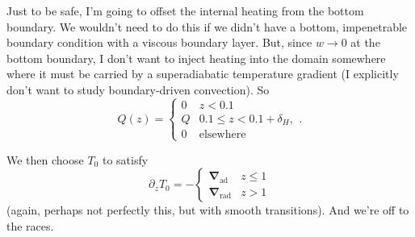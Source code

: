 \documentclass[12pt,preprint]{article}
\renewcommand{\vec}[1]{\boldsymbol{#1}}
\newcommand{\grad}{\vec{\nabla}}
\begin{document}
Just to be safe, I'm going to offset the internal heating from the bottom boundary.
We wouldn't need to do this if we didn't have a bottom, impenetrable boundary condition with a viscous boundary layer.
But, since $w \rightarrow 0$ at the bottom boundary, I don't want to inject heating into the domain somewhere where it must be carried by a superadiabatic temperature gradient (I explicitly don't want to study boundary-driven convection).
So
\begin{equation}
Q(z) = \begin{cases}
0 & z < 0.1 \\
Q & 0.1 \leq z < 0.1 + \delta_H, \\
0 & \text{elsewhere}
\end{cases}.
\end{equation}

We then choose $T_0$ to satisfy
\begin{equation}
\partial_z T_0 =
-\begin{cases}
\grad_{\mathrm{ad}} & z \leq 1 \\
\grad_{\mathrm{rad}} & z > 1
\end{cases}
\end{equation}
(again, perhaps not perfectly this, but with smooth transitions).
And we're off to the races.




\end{document}
